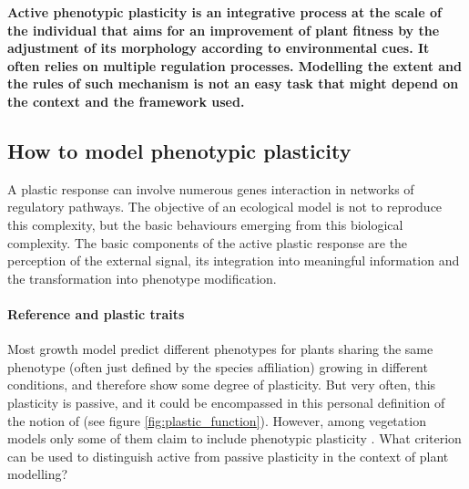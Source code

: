 \textbf{Active phenotypic plasticity is an integrative process at the scale of the individual that aims for an improvement of plant fitness by the adjustment of its morphology according to environmental cues. It often relies on multiple regulation processes. Modelling the extent and the rules of such mechanism is not an easy task that might depend on the context and the framework used.}

\subsection{How to model phenotypic plasticity}

A plastic response can involve numerous genes interaction in networks of regulatory pathways. The objective of an ecological model is not to reproduce this complexity, but the basic behaviours emerging from this biological complexity. The basic components of the active plastic response are the perception of the external signal, its integration into meaningful information and the transformation into phenotype modification.

\paragraph{Reference and plastic traits}

Most growth model predict different phenotypes for plants sharing the same phenotype (often just defined by the species affiliation) growing in different conditions, and therefore show some degree of plasticity. But very often, this plasticity is passive, and it could be encompassed in this personal definition of the notion of  (see figure \ref{fig:plastic_function}). However, among vegetation models only some of them claim to include phenotypic plasticity \parencite{maire_plasticity_2013}. What criterion can be used to distinguish active from passive plasticity in the context of plant modelling?

